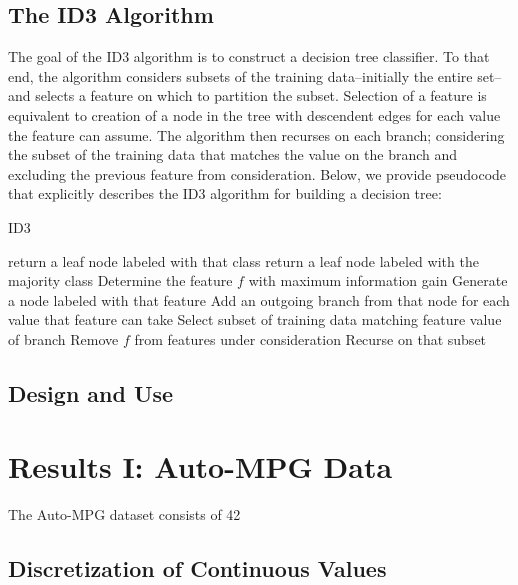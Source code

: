 \documentclass[12pt, conference, compsocconf]{IEEEtran}
\begin{document}
\subsection{The ID3 Algorithm}
The goal of the ID3 algorithm is to construct a decision tree classifier. 
To that end, the algorithm considers subsets of the training data--initially the entire set--and selects a feature on which to partition the subset. 
Selection of a feature is equivalent to creation of a node in the tree with descendent edges for each value the feature can assume.
The algorithm then recurses on each branch; considering the subset of the training data that matches the value on the branch and excluding the previous feature from consideration.
Below, we provide pseudocode that explicitly describes the ID3 algorithm for building a decision tree:

\begin{algorithm}
    \caption{ID3}
    \label{alg-id3}
    \begin{algorithmic}[1]
                \State return a leaf node labeled with that class
                \State return a leaf node labeled with the majority class
            \Else
                \State Determine the feature $f$ with maximum information gain
                \State Generate a node labeled with that feature
                \State Add an outgoing branch from that node for each value that feature can take
                    \State Select subset of training data matching feature value of branch
                    \State Remove $f$ from features under consideration
                    \State Recurse on that subset   
                \EndFor
            \EndIf
        \EndFunction
    \end{algorithmic}
\end{algorithm}

\subsection{Design and Use}

\section{Results I: Auto-MPG Data}
The Auto-MPG dataset consists of 42 

\subsection{Discretization of Continuous Values}
\end{document}
